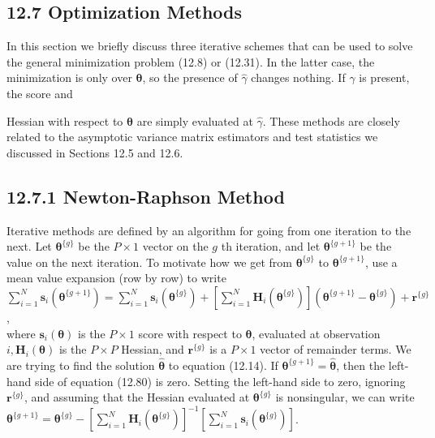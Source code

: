 \documentclass[10pt]{article}
\begin{document}
\subsection*{12.7 Optimization Methods}
In this section we briefly discuss three iterative schemes that can be used to solve the general minimization problem (12.8) or (12.31). In the latter case, the minimization is only over $\boldsymbol{\theta}$, so the presence of $\hat{\gamma}$ changes nothing. If $\hat{\gamma}$ is present, the score and

Hessian with respect to $\boldsymbol{\theta}$ are simply evaluated at $\hat{\gamma}$. These methods are closely related to the asymptotic variance matrix estimators and test statistics we discussed in Sections 12.5 and 12.6.

\subsection*{12.7.1 Newton-Raphson Method}
Iterative methods are defined by an algorithm for going from one iteration to the next. Let $\boldsymbol{\theta}^{\{g\}}$ be the $P \times 1$ vector on the $g$ th iteration, and let $\boldsymbol{\theta}^{\{g+1\}}$ be the value on the next iteration. To motivate how we get from $\boldsymbol{\theta}^{\{g\}}$ to $\boldsymbol{\theta}^{\{g+1\}}$, use a mean value expansion (row by row) to write\\
$\sum_{i=1}^{N} \mathbf{s}_{i}\left(\boldsymbol{\theta}^{\{g+1\}}\right)=\sum_{i=1}^{N} \mathbf{s}_{i}\left(\boldsymbol{\theta}^{\{g\}}\right)+\left[\sum_{i=1}^{N} \mathbf{H}_{i}\left(\boldsymbol{\theta}^{\{g\}}\right)\right]\left(\boldsymbol{\theta}^{\{g+1\}}-\boldsymbol{\theta}^{\{g\}}\right)+\mathbf{r}^{\{g\}}$,\\
where $\mathbf{s}_{i}(\boldsymbol{\theta})$ is the $P \times 1$ score with respect to $\boldsymbol{\theta}$, evaluated at observation $i, \mathbf{H}_{i}(\boldsymbol{\theta})$ is the $P \times P$ Hessian, and $\mathbf{r}^{\{g\}}$ is a $P \times 1$ vector of remainder terms. We are trying to find the solution $\hat{\boldsymbol{\theta}}$ to equation (12.14). If $\boldsymbol{\theta}^{\{g+1\}}=\hat{\boldsymbol{\theta}}$, then the left-hand side of equation (12.80) is zero. Setting the left-hand side to zero, ignoring $\mathbf{r}^{\{g\}}$, and assuming that the Hessian evaluated at $\boldsymbol{\theta}^{\{g\}}$ is nonsingular, we can write\\
$\boldsymbol{\theta}^{\{g+1\}}=\boldsymbol{\theta}^{\{g\}}-\left[\sum_{i=1}^{N} \mathbf{H}_{i}\left(\boldsymbol{\theta}^{\{g\}}\right)\right]^{-1}\left[\sum_{i=1}^{N} \mathbf{s}_{i}\left(\boldsymbol{\theta}^{\{g\}}\right)\right]$.
\end{document}
